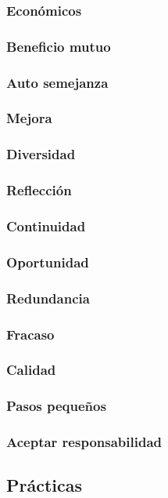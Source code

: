 \begin{spacing}{1.5}
		\subsubsection{Econ\'{o}micos}
		\subsubsection{Beneficio mutuo}
		\subsubsection{Auto semejanza}
		\subsubsection{Mejora}
		\subsubsection{Diversidad}
		\subsubsection{Reflecci\'{o}n}
		\subsubsection{Continuidad}
		\subsubsection{Oportunidad}
		\subsubsection{Redundancia}
		\subsubsection{Fracaso}
		\subsubsection{Calidad}
		\subsubsection{Pasos pequeños}
		\subsubsection{Aceptar responsabilidad}
		
	\subsection{Pr\'{a}cticas}
				\lipsum[1]

\end{spacing}
